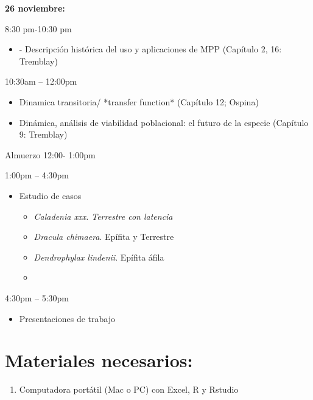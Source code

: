 \documentclass[
]{book}
\providecommand{\tightlist}{%
  \setlength{\itemsep}{0pt}\setlength{\parskip}{0pt}}
\theoremstyle{definition}
\theoremstyle{definition}
\theoremstyle{definition}
\theoremstyle{definition}
\theoremstyle{remark}
\begin{document}
\textbf{26 noviembre:}

8:30 pm-10:30 pm

\begin{itemize}
\tightlist
\item
  - Descripción histórica del uso y aplicaciones de MPP (Capítulo 2,
  16: Tremblay)
\end{itemize}

10:30am -- 12:00pm

\begin{itemize}
\item
  Dinamica transitoria/ *transfer function* (Capítulo 12; Ospina)
\item
  Dinámica, análisis de viabilidad poblacional: el futuro de la
  especie (Capítulo 9: Tremblay)
\end{itemize}

Almuerzo 12:00- 1:00pm

1:00pm -- 4:30pm

\begin{itemize}
\tightlist
\item
  Estudio de casos

  \begin{itemize}
  \tightlist
  \item
    \emph{Caladenia xxx. Terrestre con latencia}
  \item
    \emph{Dracula chimaera}. Epífita y Terrestre
  \item
    \emph{Dendrophylax lindenii}. Epífita áfila
  \item
  \end{itemize}
\end{itemize}

4:30pm -- 5:30pm

\begin{itemize}
\tightlist
\item
  Presentaciones de trabajo
\end{itemize}

\hypertarget{materiales-necesarios}{%
\section{Materiales necesarios:}\label{materiales-necesarios}}

\begin{enumerate}
\def\labelenumi{\arabic{enumi}.}
\tightlist
\item
  Computadora portátil (Mac o PC) con Excel, R y Rstudio
\end{enumerate}
\end{document}
